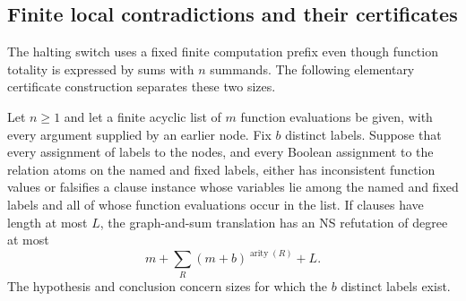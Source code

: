 \subsection{Finite local contradictions and their certificates}
\label{app:finite-certificate}
The halting switch uses a fixed finite computation prefix even though
function totality is expressed by sums with $n$ summands. The following
elementary certificate construction separates these two sizes.

\begin{lemma}\label{lem:finite-certificate}
Let $n\ge1$ and let a finite acyclic list of $m$ function evaluations be given, with every
argument supplied by an earlier node. Fix $b$ distinct labels. Suppose that
every assignment of labels to the nodes, and every Boolean assignment to
the relation atoms on the named and fixed labels, either has inconsistent
function values or falsifies a clause instance whose variables lie among the named and fixed
labels and all of whose function evaluations occur in the list. If clauses have length at most $L$, the
graph-and-sum translation has an NS refutation of degree at most
\[
                 m+\sum_R(m+b)^{\operatorname{arity}(R)}+L.
\]
The hypothesis and conclusion concern sizes for which the $b$ distinct
labels exist.
\end{lemma}
